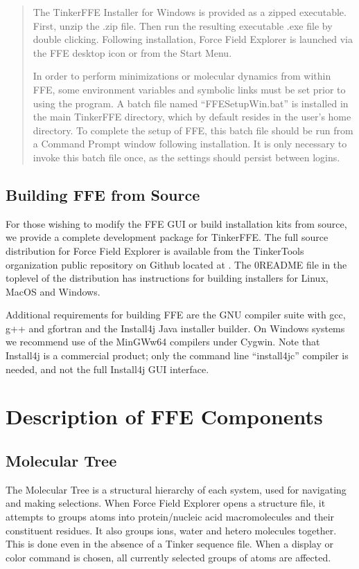 \documentclass[letterpaper,11pt,english]{sphinxmanual}
\begin{document}
\begin{itemize}
\begin{quote}
The Tinker\sphinxhyphen{}FFE Installer for Windows is provided as a zipped executable. First, unzip the .zip file. Then run the resulting executable .exe file by double clicking. Following installation, Force Field Explorer is launched via the FFE desktop icon or from the Start Menu.

In order to perform minimizations or molecular dynamics from within FFE, some environment variables and symbolic links must be set prior to using the program. A batch file named “FFESetupWin.bat” is installed in the main Tinker\sphinxhyphen{}FFE directory, which by default resides in the user’s home directory. To complete the setup of FFE, this batch file should be run from a Command Prompt window following installation. It is only necessary to invoke this batch file once, as the settings should persist between logins.
\end{quote}

\end{itemize}


\section{Building FFE from Source}
\label{\detokenize{text/installation:building-ffe-from-source}}
For those wishing to modify the FFE GUI or build installation kits from source, we provide a complete development package for Tinker\sphinxhyphen{}FFE. The full source distribution for Force Field Explorer is available from the TinkerTools organization public repository on Github located at . The 0README file in the top\sphinxhyphen{}level of the distribution has instructions for building installers for Linux, MacOS and Windows.

Additional requirements for building FFE are the GNU compiler suite with gcc, g++ and gfortran and the Install4j Java installer builder. On Windows systems we recommend use of the MinGW\sphinxhyphen{}w64 compilers under Cygwin. Note that Install4j is a commercial product; only the command line “install4jc” compiler is needed, and not the full Install4j GUI interface.


\chapter{Description of FFE Components}
\label{\detokenize{text/components:description-of-ffe-components}}\label{\detokenize{text/components::doc}}

\section{Molecular Tree}
\label{\detokenize{text/components:molecular-tree}}
The Molecular Tree is a structural hierarchy of each system, used for navigating and making selections. When Force Field Explorer opens a structure file, it attempts to groups atoms into protein/nucleic acid macromolecules and their constituent residues. It also groups ions, water and hetero molecules together. This is done even in the absence of a Tinker sequence file. When a display or color command is chosen, all currently selected groups of atoms are affected.
\end{document}
